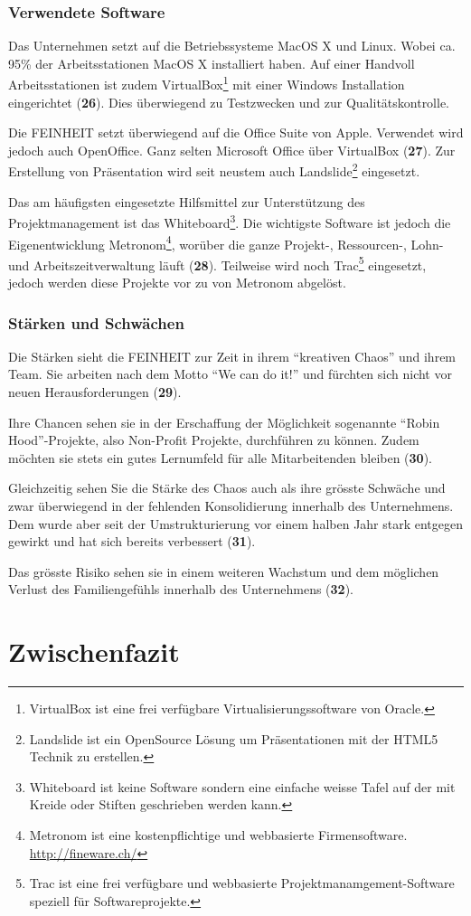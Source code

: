 \subsubsection{Verwendete Software}
Das Unternehmen setzt auf die Betriebssysteme MacOS X und Linux. Wobei ca.
95\% der Arbeitsstationen MacOS X installiert haben. Auf einer Handvoll 
Arbeitsstationen ist zudem VirtualBox\footnote{VirtualBox ist eine frei verfügbare
Virtualisierungssoftware von Oracle.} mit einer Windows Installation eingerichtet (\textbf{26}).
Dies überwiegend zu Testzwecken und zur Qualitätskontrolle.

Die FEINHEIT setzt überwiegend auf die Office Suite von Apple. Verwendet wird
jedoch auch OpenOffice. Ganz selten Microsoft Office über VirtualBox (\textbf{27}).
Zur Erstellung von Präsentation wird seit neustem auch Landslide\footnote{Landslide
ist ein OpenSource Lösung um Präsentationen mit der HTML5 Technik zu erstellen.} 
eingesetzt.

Das am häufigsten eingesetzte Hilfsmittel zur Unterstützung des Projektmanagement
ist das Whiteboard\footnote{Whiteboard ist keine Software sondern eine einfache
weisse Tafel auf der mit Kreide oder Stiften geschrieben werden kann.}. Die 
wichtigste Software ist jedoch die Eigenentwicklung Metronom\footnote{Metronom 
ist eine kostenpflichtige und webbasierte Firmensoftware. \url{http://fineware.ch/}}, worüber die ganze
Projekt-, Ressourcen-, Lohn- und Arbeitszeitverwaltung läuft (\textbf{28}). Teilweise wird
noch Trac\footnote{Trac ist eine frei verfügbare und webbasierte 
Projektmanamgement-Software speziell für Softwareprojekte.} eingesetzt, jedoch 
werden diese Projekte vor zu von Metronom abgelöst.

\subsubsection{Stärken und Schwächen}
Die Stärken sieht die FEINHEIT zur Zeit in ihrem ``kreativen Chaos'' und ihrem
Team. Sie arbeiten nach dem Motto ``We can do it!'' und fürchten sich nicht 
vor neuen Herausforderungen (\textbf{29}).

Ihre Chancen sehen sie in der Erschaffung der Möglichkeit sogenannte ``Robin Hood''-Projekte,
also Non-Profit Projekte, durchführen zu können. Zudem möchten sie stets ein
gutes Lernumfeld für alle Mitarbeitenden bleiben (\textbf{30}).

Gleichzeitig sehen Sie die Stärke des Chaos auch als ihre grösste Schwäche und 
zwar überwiegend in der fehlenden Konsolidierung innerhalb des Unternehmens. 
Dem wurde aber seit der Umstrukturierung vor einem halben Jahr stark entgegen
gewirkt und hat sich bereits verbessert (\textbf{31}).

Das grösste Risiko sehen sie in einem weiteren Wachstum und dem möglichen 
Verlust des Familiengefühls innerhalb des Unternehmens (\textbf{32}).

\section{Zwischenfazit}
